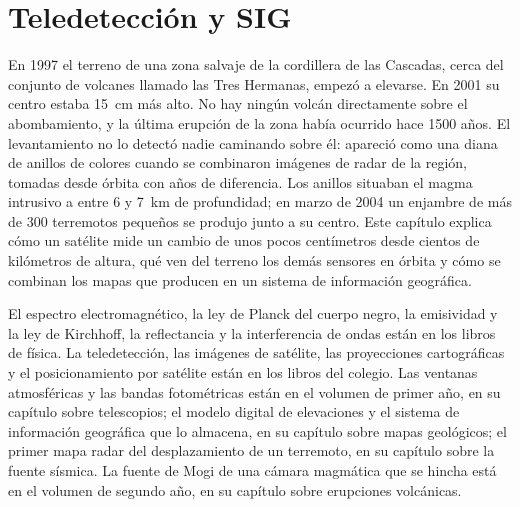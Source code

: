 \chapter{Teledetección y SIG}\label{ch:b3:remote-sensing-gis}

En 1997 el terreno de una zona salvaje de la cordillera de las Cascadas, cerca del conjunto de
volcanes llamado las Tres Hermanas, empezó a elevarse. En 2001 su centro estaba
\qty{15}{cm} más alto. No hay ningún volcán directamente sobre el abombamiento, y la
última erupción de la zona había ocurrido hace 1500 años. El levantamiento no lo detectó
nadie caminando sobre él: apareció como una diana de anillos de colores cuando se
combinaron imágenes de radar de la región, tomadas desde órbita con años de diferencia.
Los anillos situaban el magma intrusivo a entre 6 y \qty{7}{km} de profundidad; en marzo de 2004
un enjambre de más de 300 terremotos pequeños se produjo junto a su centro.
Este capítulo explica cómo un satélite mide un cambio de unos pocos
centímetros desde cientos de kilómetros de altura, qué ven del terreno los demás
sensores en órbita y cómo se combinan los mapas que producen en un
sistema de información geográfica.

\begin{recall}
El espectro electromagnético, la ley de Planck del cuerpo negro, la emisividad
y la ley de Kirchhoff, la reflectancia y la interferencia de ondas están en los
libros de física. La teledetección, las imágenes de satélite, las proyecciones
cartográficas y el posicionamiento por satélite están en los libros del colegio.
Las ventanas atmosféricas y las bandas fotométricas están en el volumen de primer
año, en su capítulo sobre telescopios; el modelo digital de elevaciones y el sistema
de información geográfica que lo almacena, en su capítulo sobre mapas geológicos; el
primer mapa radar del desplazamiento de un terremoto, en su capítulo sobre la fuente
sísmica. La fuente de Mogi de una cámara magmática que se hincha está en el volumen
de segundo año, en su capítulo sobre erupciones volcánicas.
\end{recall}

